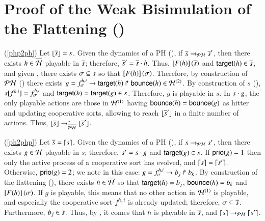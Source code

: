 \section{Proof of the Weak Bisimulation of the Flattening ()}
\label{suppl:demoflattening}

\begin{proofbisimPHP}
  (\ref{php2ph}) Let $\flats{\os} = s$.
    Given the dynamics of a PH (), if $\os \PHPtrans[\PH] \os'$,
    then there exists $h \in \ov{\PHh}$ playable in $\os$;
    therefore, $\os' = \os \PHplay h$.
    Thus, $\Fsem{\Fop{h}}{\os}$ and $\target{h} \in \os$,
    and given , there exists $\mysigma \subseteq s$ so that $\Fsem{\Fop{h}}{\mysigma}$.
    Therefore, by construction of $\PH$ () there exists
    $g = \PHhit{f^{h,i}_\mysigma}{\target{h}}{\bounce{h}} \in \PHh^{(2)}$.
    By construction of $s$ (), $\PHget{s}{f^{h,i}} = f^{h,i}_\mysigma$ and $\target{h} = \target{g} \in s$.
    Therefore, $g$ is playable in $s$.
    In $s \PHplay g$, the only playable actions are those in $\PHh^{(1)}$ having $\bounce{h} = \bounce{g}$ as hitter
    and updating cooperative sorts, allowing to reach $\flats{\os'}$ in a finite number of actions.
    Thus, $\flats{\os} \PHPtrans[\oPH]^* \flats{\os'}$.
  
  (\ref{ph2php}) Let $\os = \unflats{s}$.
    Given the dynamics of a PH (), if $s \PHPtrans s'$,
    then there exists $g \in \PHh$ playable in $s$; therefore, $s' = s \PHplay g$ and $\target{g} \in s$.
    If $\prio(g) = 1$ then only the active process of a cooperative sort has evolved, and $\unflats{s} = \unflats{s'}$.
    Otherwise, $\prio(g) = 2$; we note in this case: $g = \PHhit{f^{h,i}_\mysigma}{b_j}{b_k}$.
    By construction of the flattening (), there exists $h \in \ov{\PHh}$ so that
    $\target{h} = b_j$, $\bounce{h} = b_k$ and $\Fsem{\Fop{h}}{\mysigma}$.
    If $g$ is playable, this means that no other action in $\PHh^{(1)}$ is playable, and especially the cooperative sort
    $f^{h,i}$ is already updated; therefore, $\mysigma \subseteq \os$.
    Furthermore, $b_j \in \os$.
    Thus, by , it comes that $h$ is playable in $\os$,
    and $\unflats{s} \PHPtrans \unflats{s'}$.
\end{proofbisimPHP}

